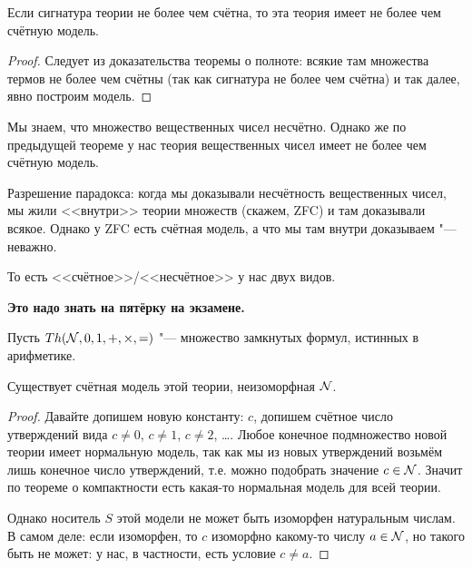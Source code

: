 \begin{theorem}
	Если сигнатура теории не более чем счётна, то эта теория имеет не более чем счётную модель.
\end{theorem}
\begin{proof}
	Следует из доказательства теоремы о полноте: всякие там множества термов не более чем счётны
	(так как сигнатура не более чем счётна) и так далее, явно построим модель.
\end{proof}
\begin{Rem}
	Мы знаем, что множество вещественных чисел несчётно.
	Однако же по предыдущей теореме у нас теория вещественных чисел имеет не более чем счётную модель.

	Разрешение парадокса: когда мы доказывали несчётность вещественных чисел, мы жили
	<<внутри>> теории множеств (скажем, ZFC) и там доказывали всякое.
	Однако у ZFC есть счётная модель, а что мы там внутри доказываем "--- неважно.

	То есть <<счётное>>/<<несчётное>> у нас двух видов.

	\textbf{Это надо знать на пятёрку на экзамене.}
\end{Rem}

\begin{assertion}
	Пусть $Th(\mathcal{N}, 0, 1, +, \times, =)$ "--- множество замкнутых формул,
	истинных в арифметике.

	Существует счётная модель этой теории, неизоморфная $\mathcal{N}$.
\end{assertion}
\begin{proof}
	Давайте допишем новую константу: $c$, допишем счётное число утверждений вида $c \neq 0$, $c \neq 1$, $c \neq 2$, \dots.
	Любое конечное подмножество новой теории имеет нормальную модель, так как мы из новых утверждений
	возьмём лишь конечное число утверждений, т.е. можно подобрать значение $c \in \mathcal{N}$.
	Значит по теореме о компактности есть какая-то нормальная модель для всей теории.

	Однако носитель $S$ этой модели не может быть изоморфен натуральным числам.
	В самом деле: если изоморфен, то $c$ изоморфно какому-то числу $a \in \mathcal{N}$,
	но такого быть не может: у нас, в частности, есть условие $c \neq a$.
\end{proof}
